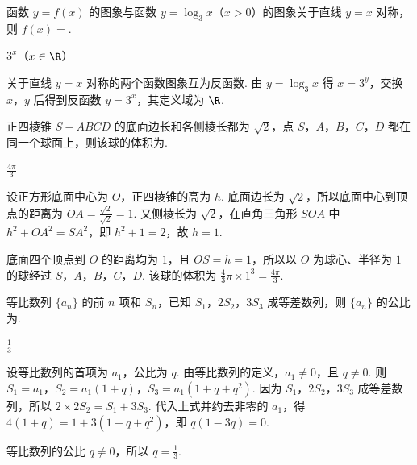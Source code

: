 \begin{problem}
函数 \( y = f(x) \) 的图象与函数 \( y = \log_{3} x \)（\(x > 0\)）的图象关于直线 \( y = x \) 对称，则 \( f(x) = \)\fillinblank{}.
\end{problem}

\begin{answer}
\(3^{x}\)（\(x\in\R\)）
\end{answer}

\begin{solution}
关于直线 \(y=x\) 对称的两个函数图象互为反函数. 由
\(y=\log_3x\) 得 \(x=3^y\)，交换 \(x\)，\(y\) 后得到反函数
\(y=3^x\)，其定义域为 \(\R\).
\end{solution}

\begin{problem}
正四棱锥 \(S - ABCD\) 的底面边长和各侧棱长都为 \(\sqrt{2}\)，点 \(S\)，\(A\)，\(B\)，\(C\)，\(D\) 都在同一个球面上，则该球的体积为\fillinblank{}.
\end{problem}

\begin{answer}
\(\frac{4\pi}{3}\)
\end{answer}

\begin{solution}
设正方形底面中心为 \(O\)，正四棱锥的高为 \(h\). 底面边长为 \(\sqrt{2}\)，所以底面中心到顶点的距离为
\(OA=\frac{\sqrt{2}}{\sqrt{2}}=1\). 又侧棱长为 \(\sqrt{2}\)，在直角三角形 \(SOA\) 中
\(h^2+OA^2=SA^2\)，即 \(h^2+1=2\)，故 \(h=1\).

底面四个顶点到 \(O\) 的距离均为 \(1\)，且 \(OS=h=1\)，所以以 \(O\) 为球心、半径为 \(1\) 的球经过 \(S\)，\(A\)，\(B\)，\(C\)，\(D\). 该球的体积为
\(\frac{4}{3}\pi\times1^3=\frac{4\pi}{3}\).
\end{solution}

\begin{problem}
等比数列 \(\{a_{n}\}\) 的前 \(n\) 项和 \(S_{n}\)，已知 \(S_{1}\)，\(2S_{2}\)，\(3S_{3}\) 成等差数列，则 \(\{a_{n}\}\) 的公比为\fillinblank{}.
\end{problem}

\begin{answer}
\(\frac{1}{3}\)
\end{answer}

\begin{solution}
设等比数列的首项为 \(a_1\)，公比为 \(q\). 由等比数列的定义，\(a_1\ne0\)，且 \(q\ne0\). 则
\(S_1=a_1\)，\(S_2=a_1(1+q)\)，\(S_3=a_1(1+q+q^2)\).
因为 \(S_1\)，\(2S_2\)，\(3S_3\) 成等差数列，所以
\(2\times2S_2=S_1+3S_3\). 代入上式并约去非零的 \(a_1\)，得
\(4(1+q)=1+3(1+q+q^2)\)，即 \(q(1-3q)=0\).

等比数列的公比 \(q\ne0\)，所以 \(q=\frac{1}{3}\).
\end{solution}

